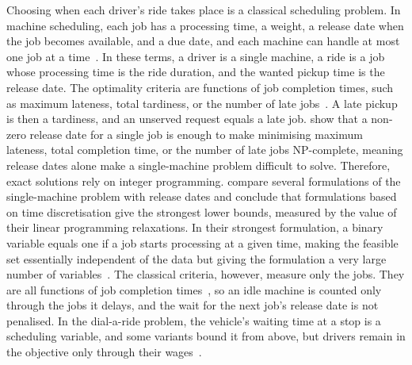 Choosing when each driver's ride takes place is a classical scheduling problem. In machine scheduling, each job has a processing time, a weight, a release date when the job becomes available, and a due date, and each machine can handle at most one job at a time~\citep{lenstra1977complexity}. In these terms, a driver is a single machine, a ride is a job whose processing time is the ride duration, and the wanted pickup time is the release date. The optimality criteria are functions of job completion times, such as maximum lateness, total tardiness, or the number of late jobs~\citep{lenstra1977complexity}. A late pickup is then a tardiness, and an unserved request equals a late job. \citet{lenstra1977complexity} show that a non-zero release date for a single job is enough to make minimising maximum lateness, total completion time, or the number of late jobs NP-complete, meaning release dates alone make a single-machine problem difficult to solve. Therefore, exact solutions rely on integer programming. \citet{dyer1990formulating} compare several formulations of the single-machine problem with release dates and conclude that formulations based on time discretisation give the strongest lower bounds, measured by the value of their linear programming relaxations. In their strongest formulation, a binary variable equals one if a job starts processing at a given time, making the feasible set essentially independent of the data but giving the formulation a very large number of variables~\citep{dyer1990formulating}. The classical criteria, however, measure only the jobs. They are all functions of job completion times~\citep{lenstra1977complexity}, so an idle machine is counted only through the jobs it delays, and the wait for the next job's release date is not penalised. In the dial-a-ride problem, the vehicle's waiting time at a stop is a scheduling variable, and some variants bound it from above, but drivers remain in the objective only through their wages~\citep{cordeau2007dialaride}.

